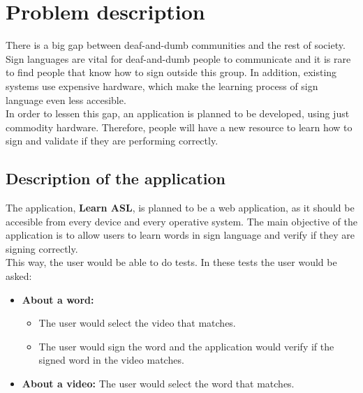\chapter{Problem description}

There is a big gap between deaf-and-dumb communities and the rest of society. Sign languages are vital for deaf-and-dumb people to communicate and it is rare to find people that know how to sign outside this group.
In addition, existing systems use expensive hardware, which make the learning process of sign language even less accesible. \\ 

In order to lessen this gap, an application is planned to be developed, using just commodity hardware. Therefore, people will have a new resource to learn how to sign and validate if they are performing correctly.

\section{Description of the application}
The application, \textbf{Learn ASL}, is planned to be a web application, as it should be accesible from every device and every operative system.
The main objective of the application is to allow users to learn words in sign language and verify if they are signing correctly. \\

This way, the user would be able to do tests. In these tests the user would be asked:
\begin{itemize}[noitemsep]
    \item \textbf{About a word:} 
        \begin{itemize}[noitemsep]
            \item The user would select the video that matches.
            \item The user would sign the word and the application would verify if the signed word in the video matches.
        \end{itemize}
    \item \textbf{About a video:} The user would select the word that matches.
\end{itemize}

